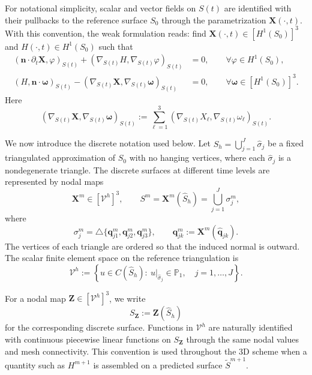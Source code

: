 \documentclass[smallextended]{svjour3}
\numberwithin{equation}{section}
\begin{document}
For notational simplicity, scalar and vector fields on $S(t)$ are identified with their pullbacks to the reference surface $S_0$ through the parametrization $\mathbf{X}(\cdot,t)$. With this convention, the weak formulation reads: find $\mathbf{X}(\cdot,t)\in[H^1(S_0)]^3$ and $H(\cdot,t)\in H^1(S_0)$ such that
\begin{subequations}
	\begin{align}
		\left(
		\mathbf{n}\cdot\partial_t\mathbf{X},
		\varphi
		\right)_{S(t)}
		+
		\left(
		\nabla_{S(t)}H,
		\nabla_{S(t)}\varphi
		\right)_{S(t)}
		&=0,
		\qquad \forall \varphi\in H^1(S_0),
		\label{eq:weak-3d-a}
		\\
		\left(
		H,
		\mathbf{n}\cdot\boldsymbol{\omega}
		\right)_{S(t)}
		-
		\left(
		\nabla_{S(t)}\mathbf{X},
		\nabla_{S(t)}\boldsymbol{\omega}
		\right)_{S(t)}
		&=0,
		\qquad \forall \boldsymbol{\omega}\in[H^1(S_0)]^3.
		\label{eq:weak-3d-b}
	\end{align}
\end{subequations}
Here
\[
\left(
\nabla_{S(t)}\mathbf{X},
\nabla_{S(t)}\boldsymbol{\omega}
\right)_{S(t)}
:=
\sum_{\ell=1}^3
\left(
\nabla_{S(t)}X_\ell,
\nabla_{S(t)}\omega_\ell
\right)_{S(t)}.
\]

We now introduce the discrete notation used below. Let
$
\widehat S_h=\bigcup_{j=1}^J \widehat\sigma_j
$
be a fixed triangulated approximation of $S_0$ with no hanging vertices, where each $\widehat\sigma_j$ is a nondegenerate triangle. The discrete surfaces at different time levels are represented by nodal maps
\[
\mathbf{X}^m\in[\mathcal V^h]^3,\qquad
S^m=\mathbf{X}^m(\widehat S_h)
=
\bigcup_{j=1}^J \sigma_j^m,
\]
where
\[
\sigma_j^m
=
\triangle\{\mathbf q_{j1}^m,\mathbf q_{j2}^m,\mathbf q_{j3}^m\},
\qquad
\mathbf q_{jk}^m:=\mathbf{X}^m(\widehat{\mathbf q}_{jk}).
\]
The vertices of each triangle are ordered so that the induced normal is outward. The scalar finite element space on the reference triangulation is
\[
\mathcal V^h
:=
\left\{
u\in C(\widehat S_h):\
u|_{\widehat\sigma_j}\in\mathbb P_1,\quad j=1,\ldots,J
\right\}.
\]

For a nodal map $\mathbf Z\in[\mathcal V^h]^3$, we write
\[
S_{\mathbf Z}:=\mathbf Z(\widehat S_h)
\]
for the corresponding discrete surface. Functions in $\mathcal V^h$ are naturally identified with continuous piecewise linear functions on $S_{\mathbf Z}$ through the same nodal values and mesh connectivity. This convention is used throughout the 3D scheme when a quantity such as $H^{m+1}$ is assembled on a predicted surface $\widetilde S^{m+1}$.
\end{document}
